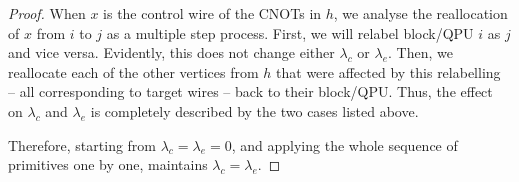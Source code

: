 \begin{proof}
When \(x\) is the control wire of the CNOTs in \(h\), we analyse the reallocation of \(x\) from \(i\) to \(j\) as a multiple step process. First, we will relabel block/QPU \(i\) as \(j\) and vice versa. Evidently, this does not change either \(\lambda_c\) or \(\lambda_e\). Then, we reallocate each of the other vertices from \(h\) that were affected by this relabelling -- all corresponding to target wires -- back to their block/QPU. Thus, the effect on \(\lambda_c\) and \(\lambda_e\) is completely described by the two cases listed above.

Therefore, starting from \(\lambda_c = \lambda_e = 0\), and applying the whole sequence of primitives one by one, maintains \(\lambda_c = \lambda_e\).

\end{proof}

\begin{comment}
\begin{algorithm}[caption={Builds the distributed circuit determined by the input hypergraph partition. The hypergraph partition is provided as an assignment \(qpuOf \colon \mathbb{N} \to \mathbb{N}\) which indicates the QPU number of the given wire},label={code:distributeVanilla}]
input: circuit, $qpuOf$
output: distributed
begin
  distributed $\gets$ $emptyCircuit$
  foreach wire in circuit do
    thisQPU = $qpuOf$(wire)
    activeConnections $\gets$ $\varnothing$
    foreach gate in wire do
      if gate == CNOT and $controlOf$(gate) == wire then
        targetQPU = $qpuOf$($targetOf$(gate))
        if targetQPU == thisQPU then
          distributed.$addCNOTAt$(wire,target)
        else
          ebit $\gets$ activeConnections.$at$(targetQPU)
          if ebit == null then
            ebit $\gets$ $distillEbit$(thisQPU, targetQPU)
            distributed.$addCatEntangler$(ebit, wire)
            activeConnections.$at$(targetQPU) $\gets$ ebit
          distributed.$addCNOTAt$(ebit,$targetOf$(gate))
      else
        distributed.$addGateAt$(gate,wire)
end
\end{algorithm}
\end{comment}


